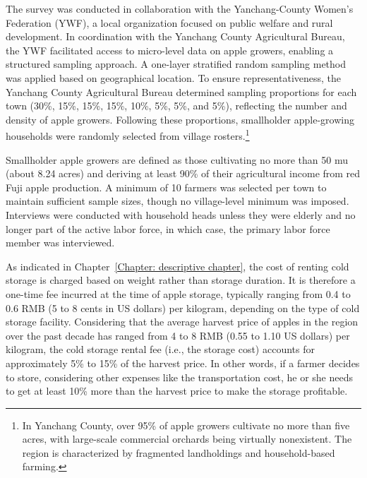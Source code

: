 The survey was conducted in collaboration with the Yanchang-County Women's Federation (YWF), a local organization focused on public welfare and rural development. In coordination with the Yanchang County Agricultural Bureau, the YWF facilitated access to micro-level data on apple growers, enabling a structured sampling approach. A one-layer stratified random sampling method was applied based on geographical location. To ensure representativeness, the Yanchang County Agricultural Bureau determined sampling proportions for each town (30\%, 15\%, 15\%, 15\%, 10\%, 5\%, 5\%, and 5\%), reflecting the number and density of apple growers. Following these proportions, smallholder apple-growing households were randomly selected from village rosters.\footnote{In Yanchang County, over 95\% of apple growers cultivate no more than five acres, with large-scale commercial orchards being virtually nonexistent. The region is characterized by fragmented landholdings and household-based farming.}  

Smallholder apple growers are defined as those cultivating no more than 50 mu (about 8.24 acres) and deriving at least 90\% of their agricultural income from red Fuji apple production. A minimum of 10 farmers was selected per town to maintain sufficient sample sizes, though no village-level minimum was imposed. Interviews were conducted with household heads unless they were elderly and no longer part of the active labor force, in which case, the primary labor force member was interviewed.  

As indicated in Chapter~\ref{Chapter: descriptive chapter}, the cost of renting cold storage is charged based on weight rather than storage duration. It is therefore a one-time fee incurred at the time of apple storage, typically ranging from 0.4 to 0.6 RMB (5 to 8 cents in US dollars) per kilogram, depending on the type of cold storage facility. Considering that the average harvest price of apples in the region over the past decade has ranged from 4 to 8 RMB (0.55 to 1.10 US dollars) per kilogram, the cold storage rental fee (i.e., the storage cost) accounts for approximately 5\% to 15\% of the harvest price. In other words, if a farmer decides to store, considering other expenses like the transportation cost, he or she needs to get at least 10\% more than the harvest price to make the storage profitable.

